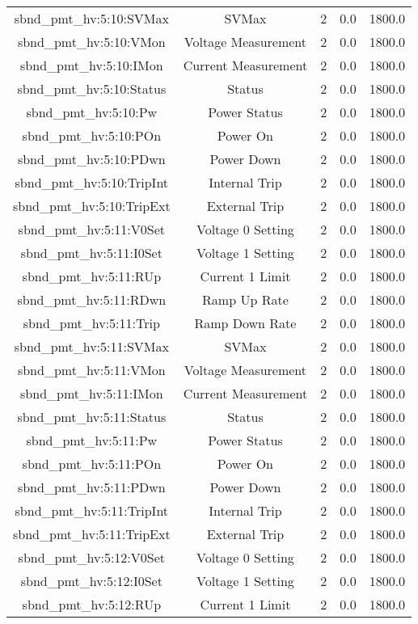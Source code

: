 \begin{center}
\begin{longtable}{c | c c c c }
sbnd\_pmt\_hv:5:10:SVMax & SVMax & 2 & 0.0 & 1800.0\\ 
sbnd\_pmt\_hv:5:10:VMon & Voltage Measurement & 2 & 0.0 & 1800.0\\ 
sbnd\_pmt\_hv:5:10:IMon & Current Measurement & 2 & 0.0 & 1800.0\\ 
sbnd\_pmt\_hv:5:10:Status & Status & 2 & 0.0 & 1800.0\\ 
sbnd\_pmt\_hv:5:10:Pw & Power Status & 2 & 0.0 & 1800.0\\ 
sbnd\_pmt\_hv:5:10:POn & Power On & 2 & 0.0 & 1800.0\\ 
sbnd\_pmt\_hv:5:10:PDwn & Power Down & 2 & 0.0 & 1800.0\\ 
sbnd\_pmt\_hv:5:10:TripInt & Internal Trip & 2 & 0.0 & 1800.0\\ 
sbnd\_pmt\_hv:5:10:TripExt & External Trip & 2 & 0.0 & 1800.0\\ 
sbnd\_pmt\_hv:5:11:V0Set & Voltage 0 Setting & 2 & 0.0 & 1800.0\\ 
sbnd\_pmt\_hv:5:11:I0Set & Voltage 1 Setting & 2 & 0.0 & 1800.0\\ 
sbnd\_pmt\_hv:5:11:RUp & Current 1 Limit & 2 & 0.0 & 1800.0\\ 
sbnd\_pmt\_hv:5:11:RDwn & Ramp Up Rate & 2 & 0.0 & 1800.0\\ 
sbnd\_pmt\_hv:5:11:Trip & Ramp Down Rate & 2 & 0.0 & 1800.0\\ 
sbnd\_pmt\_hv:5:11:SVMax & SVMax & 2 & 0.0 & 1800.0\\ 
sbnd\_pmt\_hv:5:11:VMon & Voltage Measurement & 2 & 0.0 & 1800.0\\ 
sbnd\_pmt\_hv:5:11:IMon & Current Measurement & 2 & 0.0 & 1800.0\\ 
sbnd\_pmt\_hv:5:11:Status & Status & 2 & 0.0 & 1800.0\\ 
sbnd\_pmt\_hv:5:11:Pw & Power Status & 2 & 0.0 & 1800.0\\ 
sbnd\_pmt\_hv:5:11:POn & Power On & 2 & 0.0 & 1800.0\\ 
sbnd\_pmt\_hv:5:11:PDwn & Power Down & 2 & 0.0 & 1800.0\\ 
sbnd\_pmt\_hv:5:11:TripInt & Internal Trip & 2 & 0.0 & 1800.0\\ 
sbnd\_pmt\_hv:5:11:TripExt & External Trip & 2 & 0.0 & 1800.0\\ 
sbnd\_pmt\_hv:5:12:V0Set & Voltage 0 Setting & 2 & 0.0 & 1800.0\\ 
sbnd\_pmt\_hv:5:12:I0Set & Voltage 1 Setting & 2 & 0.0 & 1800.0\\ 
sbnd\_pmt\_hv:5:12:RUp & Current 1 Limit & 2 & 0.0 & 1800.0\\ 

\end{longtable}
\end{center}
